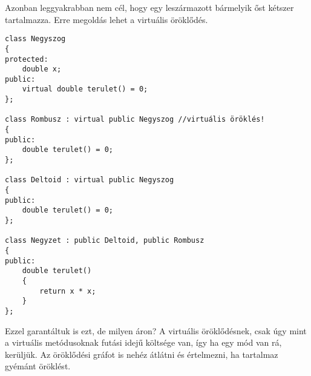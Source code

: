 \documentclass[a4paper,11.5pt,table]{article}
\begin{document}
	Azonban leggyakrabban nem cél, hogy egy leszármazott bármelyik őst kétszer tartalmazza. Erre megoldás lehet a virtuális öröklődés.
\begin{lstlisting}
class Negyszog 
{
protected:
	double x;
public:
	virtual double terulet() = 0;
};

class Rombusz : virtual public Negyszog //virtuális öröklés!
{
public:
	double terulet() = 0; 
};

class Deltoid : virtual public Negyszog
{
public:
	double terulet() = 0;
};

class Negyzet : public Deltoid, public Rombusz
{
public:
	double terulet()
	{
		return x * x;
	}
};
\end{lstlisting}
	Ezzel garantáltuk is ezt, de milyen áron? A virtuális öröklődésnek, csak úgy mint a virtuális metódusoknak futási idejű költsége van, így ha egy mód van rá, kerüljük. Az öröklődési gráfot is nehéz átlátni és értelmezni, ha tartalmaz gyémánt öröklést.
	
\end{document}
